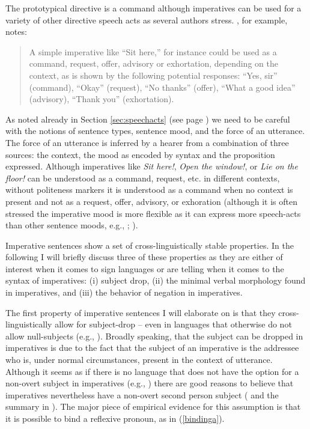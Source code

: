\newpage 
The prototypical directive is a command \citep[1--2]{aikhenval2010imp} although imperatives can be used for a variety of other directive speech acts as several authors stress. \citet[213]{clark1996using}, for example, notes:

\begin{quote}
A simple imperative like ``Sit here,'' for instance could be used as a command, request, offer, advisory or exhortation, depending on the context, as is shown by the following potential responses: ``Yes, sir'' (command), ``Okay'' (request), ``No thanks'' (offer), ``What a good idea'' (advisory), ``Thank you'' (exhortation).
\end{quote}

\noindent As noted already in Section \ref{sec:speechacts} (see page \pageref{threesources}) we need to be careful with the notions of sentence types, sentence mood, and the force of an utterance. The force of an utterance is inferred by a hearer from a combination of three sources: the context, the mood as encoded by syntax and the proposition expressed. Although imperatives like \textit{Sit here!}, \textit{Open the window!}, or \textit{Lie on the floor!} can be understood as a command, request, etc. in different contexts, without politeness markers it is understood as a command when no context is present and not as a request, offer, advisory, or exhoration (although it is often stressed the imperative mood is more flexible as it can express more speech-acts than other sentence moods, e.g., \citealt{portner2004semantics}; \citealt{kaufmann2012terpreting}).

Imperative sentences show a set of cross-linguistically stable properties. In the following I will briefly discuss three of these properties as they are either of interest when it comes to sign languages or are telling when it comes to the syntax of imperatives: (i) subject drop, (ii) the minimal verbal morphology found in imperatives, and (iii) the behavior of negation in imperatives. 

The first property of imperative sentences I will elaborate on is that they cross-linguistically allow for subject-drop -- even in languages that otherwise do not allow null-subjects (e.g., \citealt{alcazar2014syntax}). Broadly speaking, that the subject can be dropped in imperatives is due to the fact that the subject of an imperative is the addressee who is, under normal circumstances, present in the context of utterance. Although it seems as if there is no language that does not have the option for a non-overt subject in imperatives (e.g., \citealt{sadock1985speech}) there are good reasons to believe that imperatives nevertheless have a non-overt second person subject (\citealt{zwicky1988subject, potsdam1996syntactic} and the summary in \citealt[33--34]{van2007imperatives}). The major piece of empirical evidence for this assumption is that it is possible to bind a reflexive pronoun, as in (\ref{bindinga}).

